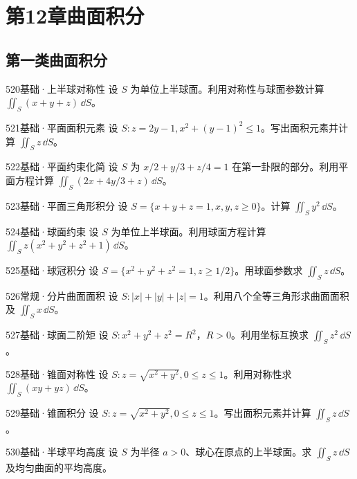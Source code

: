 \section{第12章\quad 曲面积分}
\subsection{第一类曲面积分}
\begin{exercise}{520}{基础·上半球对称性}
设 $S$ 为单位上半球面。利用对称性与球面参数计算 $\iint_S(x+y+z)\,\dd S$。
\end{exercise}
\begin{exercise}{521}{基础·平面面积元素}
设 $S:z=2y-1,x^2+(y-1)^2\leq1$。写出面积元素并计算 $\iint_Sz\,\dd S$。
\end{exercise}
\begin{exercise}{522}{基础·平面约束化简}
设 $S$ 为 $x/2+y/3+z/4=1$ 在第一卦限的部分。利用平面方程计算 $\iint_S(2x+4y/3+z)\,\dd S$。
\end{exercise}
\begin{exercise}{523}{基础·平面三角形积分}
设 $S=\{x+y+z=1,x,y,z\geq0\}$。计算 $\iint_Sy^2\,\dd S$。
\end{exercise}
\begin{exercise}{524}{基础·球面约束}
设 $S$ 为单位上半球面。利用球面方程计算 $\iint_Sz(x^2+y^2+z^2+1)\,\dd S$。
\end{exercise}
\begin{exercise}{525}{基础·球冠积分}
设 $S=\{x^2+y^2+z^2=1,z\geq1/2\}$。用球面参数求 $\iint_Sz\,\dd S$。
\end{exercise}
\begin{exercise}{526}{常规·分片曲面面积}
设 $S:|x|+|y|+|z|=1$。利用八个全等三角形求曲面面积及 $\iint_Sx\,\dd S$。
\end{exercise}
\begin{exercise}{527}{基础·球面二阶矩}
设 $S:x^2+y^2+z^2=R^2$，$R>0$。利用坐标互换求 $\iint_Sz^2\,\dd S$。
\end{exercise}
\begin{exercise}{528}{基础·锥面对称性}
设 $S:z=\sqrt{x^2+y^2},0\leq z\leq1$。利用对称性求 $\iint_S(xy+yz)\,\dd S$。
\end{exercise}
\begin{exercise}{529}{基础·锥面积分}
设 $S:z=\sqrt{x^2+y^2},0\leq z\leq1$。写出面积元素并计算 $\iint_Sz\,\dd S$。
\end{exercise}
\begin{exercise}{530}{基础·半球平均高度}
设 $S$ 为半径 $a>0$、球心在原点的上半球面。求 $\iint_Sz\,\dd S$ 及均匀曲面的平均高度。
\end{exercise}
